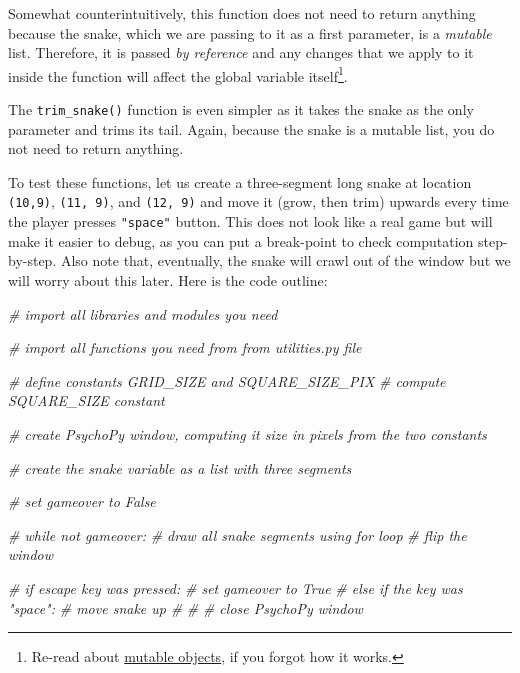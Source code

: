 \documentclass[
]{book}
\newenvironment{Shaded}{\begin{snugshade}}{\end{snugshade}}
\newcommand{\CommentTok}[1]{\textcolor[rgb]{0.56,0.35,0.01}{\textit{#1}}}
\begin{document}
Somewhat counterintuitively, this function does not need to return anything because the snake, which we are passing to it as a first parameter, is a \emph{mutable} list. Therefore, it is passed \emph{by reference} and any changes that we apply to it inside the function will affect the global variable itself\footnote{Re-read about \protect\hyperlink{mutable-objects}{mutable objects}, if you forgot how it works.}.

The \texttt{trim\_snake()} function is even simpler as it takes the snake as the only parameter and trims its tail. Again, because the snake is a mutable list, you do not need to return anything.

To test these functions, let us create a three-segment long snake at location \texttt{(10,9)}, \texttt{(11,\ 9)}, and \texttt{(12,\ 9)} and move it (grow, then trim) upwards every time the player presses \texttt{"space"} button. This does not look like a real game but will make it easier to debug, as you can put a break-point to check computation step-by-step. Also note that, eventually, the snake will crawl out of the window but we will worry about this later. Here is the code outline:

\begin{Shaded}
\begin{Highlighting}[]
\CommentTok{\# import all libraries and modules you need}

\CommentTok{\# import all functions you need from from utilities.py file}

\CommentTok{\# define constants GRID\_SIZE and SQUARE\_SIZE\_PIX}
\CommentTok{\# compute SQUARE\_SIZE constant}

\CommentTok{\# create PsychoPy window, computing it size in pixels from the two constants}

\CommentTok{\# create the snake variable as a list with three segments}

\CommentTok{\# set gameover to False}

\CommentTok{\# while not gameover:}
\CommentTok{\#     draw all snake segments using for loop  }
\CommentTok{\#     flip the window}

\CommentTok{\#     if escape key was pressed:}
\CommentTok{\#         set gameover to True}
\CommentTok{\#     else if the key was "space":}
\CommentTok{\#         move snake up  }
\CommentTok{\#}
\CommentTok{\#}
\CommentTok{\# close PsychoPy window}
\end{Highlighting}
\end{Shaded}
\end{document}
